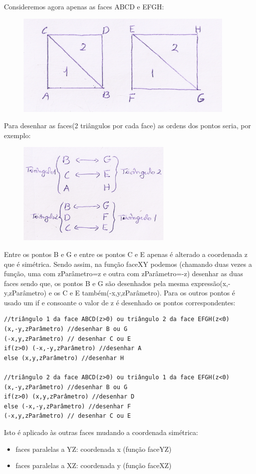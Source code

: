 \documentclass{article}
\begin{document}
Consideremos agora apenas as faces ABCD e EFGH:
\begin{figure}[H]
    \centering
    \includegraphics[height=5cm]{boxMath2.png}
\end{figure}
Para desenhar as faces(2 triângulos por cada face) as ordens dos pontos seria, por exemplo:
\begin{figure}[H]
    \centering
    \includegraphics[height=5cm]{boxMath3.png}
\end{figure}
Entre os pontos B e G e entre os pontos C e E apenas é alterado a coordenada z que é simétrica. Sendo assim, na função faceXY podemos (chamando duas vezes a função, uma com zParâmetro=z e outra com zParâmetro=-z) desenhar as duas faces sendo que, os pontos B e G são desenhados pela mesma expressão(x,-y,zParâmetro) e os C e E também(-x,y,zParâmetro). Para os outros pontos é usado um if e consoante o valor de z é desenhado os pontos correspondentes:
\begin{verbatim}
//triângulo 1 da face ABCD(z>0) ou triângulo 2 da face EFGH(z<0)
(x,-y,zParâmetro) //desenhar B ou G
(-x,y,zParâmetro) // desenhar C ou E
if(z>0) (-x,-y,zParâmetro) //desenhar A
else (x,y,zParâmetro) //desenhar H

//triângulo 2 da face ABCD(z>0) ou triângulo 1 da face EFGH(z<0)
(x,-y,zParâmetro) //desenhar B ou G
if(z>0) (x,y,zParâmetro) //desenhar D
else (-x,-y,zParâmetro) //desenhar F
(-x,y,zParâmetro) // desenhar C ou E
\end{verbatim}
Isto é aplicado às outras faces mudando a coordenada simétrica:
\begin{itemize}
    \item faces paralelas a YZ: coordenada x (função faceYZ)
    \item faces paralelas a XZ: coordenada y (função faceXZ) 
\end{itemize}
\end{document}
